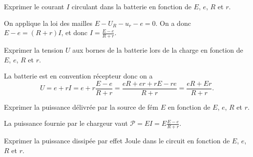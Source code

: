\begin{enonce}
Exprimer le courant $I$ circulant dans la batterie en fonction de $E$, $e$, $R$ et $r$.

\end{enonce}


\begin{corrige}
On applique la loi des mailles $E-U_R-u_r-e=0$. On a donc $E-e=(R+r)I$, et donc $I=\frac{E-e}{R+r}$.
\end{corrige}




\begin{enonce}
Exprimer la tension $U$ aux bornes de la batterie lors de la charge  en fonction de $E$, $e$, $R$ et $r$.

\end{enonce}


\begin{corrige}
La batterie est en convention récepteur donc on a
\[
U=e+rI=e+r\frac{E-e}{R+r}=\frac{eR+er+rE-re}{R+r}=\frac{eR+Er}{R+r}.
\]
\end{corrige}




\begin{enonce}
Exprimer la puissance délivrée par la source de fém $E$ en fonction de $E$, $e$, $R$ et $r$.

\end{enonce}


\begin{corrige}
La puissance fournie par le chargeur vaut $\mathcal{P}=EI=E\frac{E-e}{R+r}$.
\end{corrige}




\begin{enonce}
Exprimer la puissance dissipée par effet Joule dans le circuit  en fonction de $E$, $e$, $R$ et $r$.

\end{enonce}

